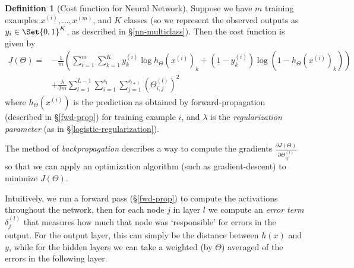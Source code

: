 \documentclass[a4paper,12pt]{article}
\theoremstyle{definition}
\newtheorem*{defn}{Definition}
\begin{document}
\begin{defn}[Cost function for Neural Network]
Suppose we have $m$ training examples $x^{(i)}, \ldots, x^{(m)}$, and $K$ classes (so we represent the observed outputs as $y_i \in \Set{0, 1}^K$, as described in \S\ref{nn-multiclass}). Then the cost function is given by
\begin{align*}
J(\Theta) = &- \frac{1}{m} \left( \sum_{i=1}^{m} \sum_{k=1}^{K} y_k^{(i)} \log{h_{\Theta}(x^{(i)})_k} + (1 - y_k^{(i)}) \log{(1 - h_{\Theta}(x^{(i)})_k)} \right) \\
&+ \frac{\lambda}{2m} \sum_{l = 1}^{L-1} \sum_{i=1}^{s_l} \sum_{j=1}^{s_{l+1}} ( \Theta_{i, j}^{(l)} )^2
\end{align*}
where $h_{\Theta}(x^{(i)})$ is the prediction as obtained by forward-propagation (described in \S\ref{fwd-prop}) for training example $i$, and $\lambda$ is the \emph{regularization parameter} (as in \S\ref{logistic-regularization}).
\end{defn}

The method of \emph{backpropagation} describes a way to compute the gradients $\frac{\partial J(\Theta)}{\partial \Theta_{ij}^{(l)}}$ so that we can apply an optimization algorithm (such as gradient-descent) to minimize $J(\Theta)$.

Intuitively, we run a forward pass (\S\ref{fwd-prop}) to compute the activations throughout the network, then for each node $j$ in layer $l$ we compute an \emph{error term} $\delta_j^{(l)}$ that measures how much that node was `responsible' for errors in the output. For the output layer, this can simply be the distance between $h(x)$ and $y$, while for the hidden layers we can take a weighted (by $\Theta$) averaged of the errors in the following layer.
\end{document}
